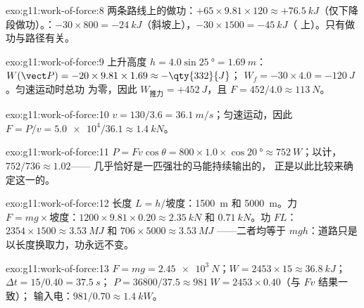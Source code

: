 \begin{solution}{exo:g11:work-of-force:8}
两条路线上的做功：$+65 \times 9.81 \times 120 \approx
+\qty{76.5}{kJ}$（仅下降段做功）。：$-30 \times 800 =
-\qty{24}{kJ}$（斜坡上），$-30 \times 1500 = -\qty{45}{kJ}$（
上）。只有做功与路径有关。
\end{solution}

\begin{solution}{exo:g11:work-of-force:9}
上升高度 $h = 4.0\sin\qty{25}{\degree} = \qty{1.69}{m}$：
$W(\vect P) = -20 \times 9.81 \times 1.69 \approx -\qty{332}{J}$；
$W_f = -30 \times 4.0 = -\qty{120}{J}$。匀速运动时总功
为零，因此 $W_{\text{推力}} = +\qty{452}{J}$，且
$F = 452/4.0 \approx \qty{113}{N}$。
\end{solution}

\begin{solution}{exo:g11:work-of-force:10}
$v = 130/3.6 = \qty{36.1}{m/s}$；匀速运动，因此
$F = P/v = \num{5.0e4}/36.1 \approx \qty{1.4}{kN}$。
\end{solution}

\begin{solution}{exo:g11:work-of-force:11}
$P = Fv\cos\theta = 800 \times 1.0 \times \cos\qty{20}{\degree}
\approx \qty{752}{W}$；以计，$752/736 \approx \num{1.02}$——
几乎恰好是一匹强壮的马能持续输出的，
正是以此比较来确定这一的。
\end{solution}

\begin{solution}{exo:g11:work-of-force:12}
长度 $L = h/\text{坡度}$：\qty{1500}{m} 和 \qty{5000}{m}。力
$F = mg \times \text{坡度}$：$1200 \times 9.81 \times 0.20 \approx
\qty{2.35}{kN}$ 和 $\qty{0.71}{kN}$。功 $FL$：$2354 \times 1500
\approx \qty{3.53}{MJ}$ 和 $706 \times 5000 \approx \qty{3.53}{MJ}$
——二者均等于 $mgh$：道路只是以长度换取力，功永远不变。
\end{solution}

\begin{solution}{exo:g11:work-of-force:13}
$F = mg = \qty{2.45e3}{N}$；$W = 2453 \times 15 \approx \qty{36.8}{kJ}$；
$\Delta t = 15/0.40 = \qty{37.5}{s}$；
$P = 36800/37.5 \approx \qty{981}{W} = 2453 \times 0.40$（与 $Fv$ 结果一致）；
输入电：$981/0.70 \approx \qty{1.4}{kW}$。
\end{solution}

